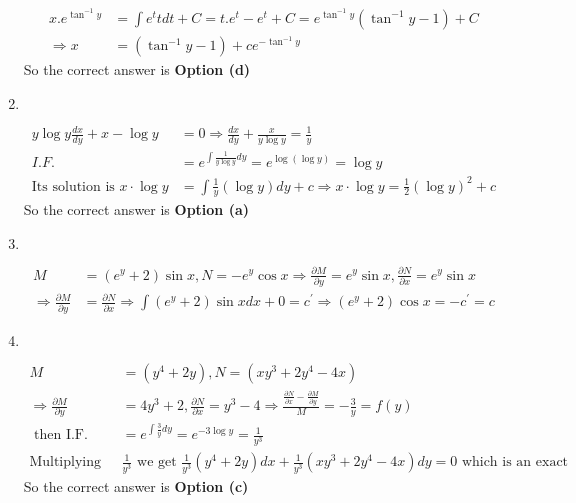 \begin{enumerate}
\begin{answer}
\begin{align*}
	x . e^{\tan ^{-1} y}&=\int e^{t} t d t+C=t . e^{t}-e^{t}+C=e^{\tan ^{-1} y}\left(\tan ^{-1} y-1\right)+C\\
	\Rightarrow x&=\left(\tan ^{-1} y-1\right)+c e^{-\tan ^{-1} y}
	\end{align*}
		So the correct answer is \textbf{Option (d)}
\end{answer}
	\item $\left. \right. $
\begin{answer}
	\begin{align*}
	y \log y \frac{d x}{d y}+x-\log y&=0 \Rightarrow \frac{d x}{d y}+\frac{x}{y \log y}=\frac{1}{y}\\
	I . F .&=e^{\int \frac{1}{y \log y} d y}=e^{\log (\log y)}=\log y\\
	\text{Its solution is }x \cdot \log y&=\int \frac{1}{y}(\log y) d y+c \Rightarrow x \cdot \log y=\frac{1}{2}(\log y)^{2}+c
	\end{align*}
		So the correct answer is \textbf{Option (a)}
\end{answer}
\item $\left. \right. $
\begin{answer}
	\begin{align*}
	M&=\left(e^{y}+2\right) \sin x, N=-e^{y} \cos x \Rightarrow \frac{\partial M}{\partial y}=e^{y} \sin x, \frac{\partial N}{\partial x}=e^{y} \sin x\\
	\Rightarrow \frac{\partial M}{\partial y}&=\frac{\partial N}{\partial x} \Rightarrow \int\left(e^{y}+2\right) \sin x d x+0=c^{\prime} \Rightarrow\left(e^{y}+2\right) \cos x=-c^{\prime}=c
	\end{align*}
\end{answer}
\item $\left. \right. $
\begin{answer}
	\begin{align*}
	M&=\left(y^{4}+2 y\right), N=\left(x y^{3}+2 y^{4}-4 x\right)\\
	\Rightarrow \frac{\partial M}{\partial y}&=4 y^{3}+2, \frac{\partial N}{\partial x}=y^{3}-4 \Rightarrow \frac{\frac{\partial N}{\partial x}-\frac{\partial M}{\partial y}}{M}=-\frac{3}{y}=f(y)\\
\text{	then I.F. }&=e^{\int \frac{3}{y} d y}=e^{-3 \log y}=\frac{1}{y^{3}}\\
\text{Multiplying by }&\frac{1}{y^{3}}\text{ we get }\frac{1}{y^{3}}\left(y^{4}+2 y\right) d x+\frac{1}{y^{3}}\left(x y^{3}+2 y^{4}-4 x\right) d y=0\text{ which is an exact}
	\end{align*}
	So the correct answer is \textbf{Option (c)}

\end{answer}
\end{enumerate}
